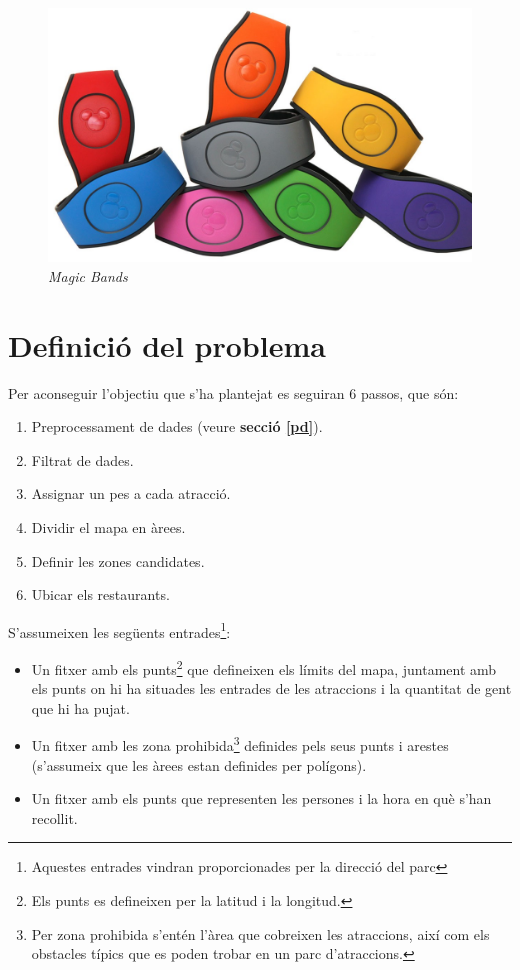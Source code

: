 \documentclass[12pt]{article}
\begin{document}
\begin{figure}[H]
    \centering
    \includegraphics[width=1\textwidth]{imatges/magic_bands.jpg}
    \caption{\textit{Magic Bands}}
    \label{fig:magic_bands}
\end{figure}

\clearpage
\section{Definició del problema}
Per aconseguir l'objectiu que s'ha plantejat es seguiran 6 passos, que són:
\begin{enumerate}
	\item Preprocessament de dades (veure \textbf{secció \ref{pd}}).
	\item Filtrat de dades.
	\item Assignar un pes a cada atracció.
	\item Dividir el mapa en àrees.
	\item Definir les zones candidates.
	\item Ubicar els restaurants.
\end{enumerate}

S'assumeixen les següents entrades\footnote{Aquestes entrades vindran proporcionades per la direcció del parc}:
\begin{itemize}
	\item Un fitxer amb els punts\footnote{Els punts es defineixen per la latitud i la longitud.} que defineixen els límits del mapa, juntament amb els punts on hi ha situades les entrades de les atraccions i la quantitat de gent que hi ha pujat.
	\item Un fitxer amb les zona prohibida\footnote{Per zona prohibida s'entén l'àrea que cobreixen les atraccions, així com els obstacles típics que es poden trobar en un parc d'atraccions.} definides pels seus punts i arestes (s'assumeix que les àrees estan definides per polígons).
	\item Un fitxer amb els punts que representen les persones i la hora en què s'han recollit.
\end{itemize}
\end{document}
